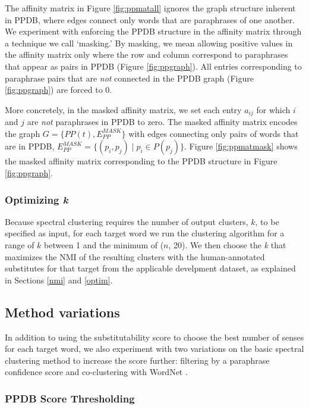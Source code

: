 \documentclass[11pt]{article}
\begin{document}
The affinity matrix in Figure \ref{fig:ppmatall} ignores the graph structure inherent in PPDB, where edges connect only words that are paraphrases of one another. We experiment with enforcing the PPDB structure in the affinity matrix through a technique we call `masking.' By masking, we mean allowing positive values in the affinity matrix only where the row and column correspond to paraphrases that appear as pairs in PPDB (Figure \ref{fig:ppgraph}). All entries corresponding to paraphrase pairs that are \textit{not} connected in the PPDB graph (Figure \ref{fig:ppgraph}) are forced to 0.

More concretely, in the masked affinity matrix, we set each entry $a_{ij}$ for which $i$ and $j$ are \textit{not} paraphrases in PPDB to zero. The masked affinity matrix encodes the graph $G = \{PP(t), E_{PP}^{MASK}\}$ with edges connecting only pairs of words that are in PPDB, $E_{PP}^{MASK} = \{(p_i, p_j) \mid p_i \in P(p_j)\}$. Figure \ref{fig:ppmatmask} shows the masked affinity matrix corresponding to the PPDB structure in Figure \ref{fig:ppgraph}.

\subsubsection{Optimizing \textit{k}}
\label{optimk}

Because spectral clustering requires the number of output clusters, $k$, to be specified as input, for each target word we run the clustering algorithm for a range of $k$ between 1 and the minimum of ($n$,  20). We then choose the \textit{k} that maximizes the NMI of the resulting clusters with the human-annotated substitutes for that target from the applicable develpment dataset, as explained in Sections \ref{nmi} and \ref{optim}.

\subsection{Method variations}

In addition to using the substitutability score to choose the best number of senses for each target word, we also experiment with 
two variations on the basic spectral clustering method to increase the score further: filtering by a paraphrase confidence score and co-clustering with WordNet \cite{fellbaum98wordnet}. 


\subsubsection{PPDB Score Thresholding}
\end{document}
